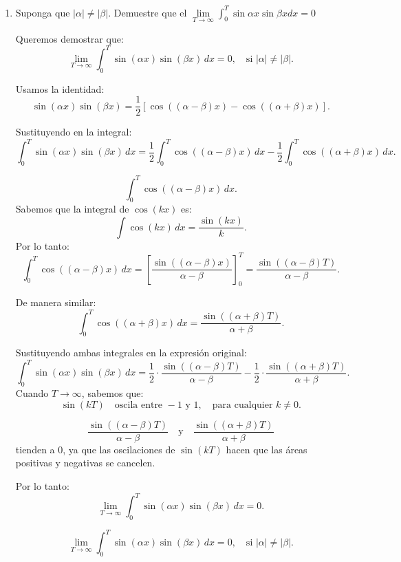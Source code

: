 \documentclass{article}
\begin{document}
\begin{enumerate}
\[
\lim_{h \to 0} \int_{-1}^1 \frac{h}{h^2 + x^2} f(x) \, dx = \pi f(0).
\]


\[
\boxed{\lim_{h \to 0} \int_{-1}^1 \frac{h}{h^2 + x^2} f(x) \, dx = \pi f(0).}
\]
	
	\item Suponga que $ |\alpha|\neq |\beta| $. Demuestre que el $ \lim\limits_{T\rightarrow\infty}\int_{0}^{T} \sin \alpha x \sin \beta x dx=0 $
  
Queremos demostrar que:
\[
\lim_{T \to \infty} \int_0^T \sin(\alpha x) \sin(\beta x) \, dx = 0, \quad \text{si } |\alpha| \neq |\beta|.
\]

Usamos la identidad:
\[
\sin(\alpha x) \sin(\beta x) = \frac{1}{2} \left[ \cos((\alpha - \beta)x) - \cos((\alpha + \beta)x) \right].
\]

Sustituyendo en la integral:
\[
\int_0^T \sin(\alpha x) \sin(\beta x) \, dx = \frac{1}{2} \int_0^T \cos((\alpha - \beta)x) \, dx - \frac{1}{2} \int_0^T \cos((\alpha + \beta)x) \, dx.
\]


\[
\int_0^T \cos((\alpha - \beta)x) \, dx.
\]
Sabemos que la integral de \( \cos(kx) \) es:
\[
\int \cos(kx) \, dx = \frac{\sin(kx)}{k}.
\]
Por lo tanto:
\[
\int_0^T \cos((\alpha - \beta)x) \, dx = \left[ \frac{\sin((\alpha - \beta)x)}{\alpha - \beta} \right]_0^T = \frac{\sin((\alpha - \beta)T)}{\alpha - \beta}.
\]


De manera similar:
\[
\int_0^T \cos((\alpha + \beta)x) \, dx = \frac{\sin((\alpha + \beta)T)}{\alpha + \beta}.
\]


Sustituyendo ambas integrales en la expresión original:
\[
\int_0^T \sin(\alpha x) \sin(\beta x) \, dx = \frac{1}{2} \cdot \frac{\sin((\alpha - \beta)T)}{\alpha - \beta} - \frac{1}{2} \cdot \frac{\sin((\alpha + \beta)T)}{\alpha + \beta}.
\]
Cuando \( T \to \infty \), sabemos que:
\[
\sin(kT) \quad \text{oscila entre } -1 \text{ y } 1, \quad \text{para cualquier } k \neq 0.
\]

\[
\frac{\sin((\alpha - \beta)T)}{\alpha - \beta} \quad \text{y} \quad \frac{\sin((\alpha + \beta)T)}{\alpha + \beta}
\]
tienden a 0, ya que las oscilaciones de \(\sin(kT)\) hacen que las áreas positivas y negativas se cancelen.

Por lo tanto:
\[
\lim_{T \to \infty} \int_0^T \sin(\alpha x) \sin(\beta x) \, dx = 0.
\]

\[
\boxed{\lim_{T \to \infty} \int_0^T \sin(\alpha x) \sin(\beta x) \, dx = 0, \quad \text{si } |\alpha| \neq |\beta|.}
\]

\end{enumerate}
\end{document}
